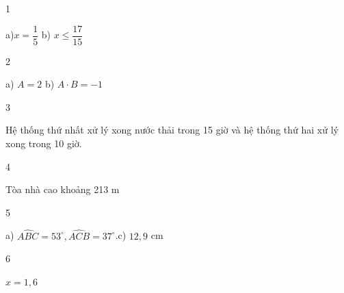 \begin{Solbook}{1}
 \par \noindent  a)$x=\dfrac {1}{5}$ \hspace {2cm} b) $x\le \dfrac {17}{15}$  \hfill \qedEX 
\end{Solbook}
\begin{Solbook}{2}
 \par \noindent  a) $A=2$ \hspace {2cm} b) $A\cdot B=-1$  \hfill \qedEX 
\end{Solbook}
\begin{Solbook}{3}
 \par \noindent  Hệ thống thứ nhất xử lý xong nước thải trong 15 giờ và hệ thống thứ hai xử lý xong trong 10 giờ.  \hfill \qedEX 
\end{Solbook}
\begin{Solbook}{4}
 \par \noindent Tòa nhà cao khoảng 213 m  \hfill \qedEX 
\end{Solbook}
\begin{Solbook}{5}
 \par \noindent a) $\widehat {ABC}=53^\circ , \widehat {ACB}=37^\circ $.\hfill c) $12,9$ cm \hfill  \hfill \qedEX 
\end{Solbook}
\begin{Solbook}{6}
 \par \noindent  $x=1,6$  \hfill \qedEX 
\end{Solbook}
